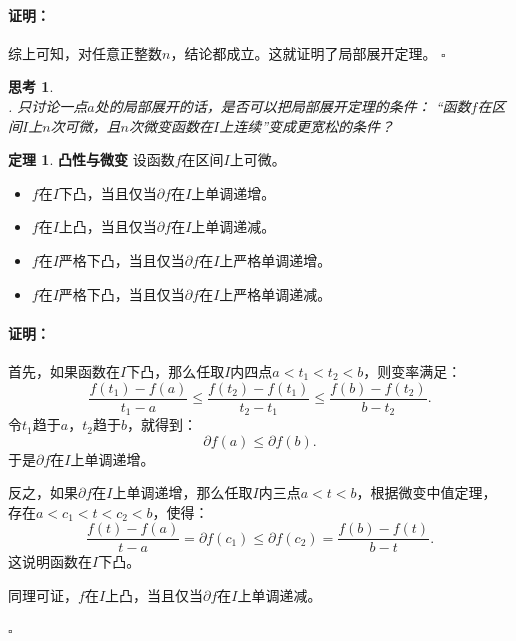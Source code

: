 \documentclass[12pt,UTF8]{ctexbook}
\theoremstyle{definition}
\newtheorem{tm}{定理}[section]
\theoremstyle{plain}
\newtheorem{sk}{思考}[section]
\renewenvironment{proof}{\paragraph{\textbf{证明：}}}{\hfill$\square$}
\begin{document}
\begin{appendix}
\begin{proof}
    综上可知，对任意正整数$n$，结论都成立。这就证明了局部展开定理。
\end{proof}

\begin{sk}
    \mbox{} \\
    . 只讨论一点$a$处的局部展开的话，是否可以把局部展开定理的条件：
    “函数$f$在区间$I$上$n$次可微，且$n$次微变函数在$I$上连续”变成更宽松的条件？\\
\end{sk}

\begin{tm}{\textbf{凸性与微变}}
    设函数$f$在区间$I$上可微。
    \begin{itemize}
        \item $f$在$I$下凸，当且仅当$\partial f$在$I$上单调递增。
        \item $f$在$I$上凸，当且仅当$\partial f$在$I$上单调递减。
        \item $f$在$I$严格下凸，当且仅当$\partial f$在$I$上严格单调递增。
        \item $f$在$I$严格下凸，当且仅当$\partial f$在$I$上严格单调递减。
    \end{itemize}
\end{tm}

\begin{proof}
    首先，如果函数在$I$下凸，那么任取$I$内四点$a < t_1 < t_2 < b$，则变率满足：
    $$ \frac{f(t_1) - f(a)}{t_1 - a} \leqslant \frac{f(t_2) - f(t_1)}{t_2 - t_1} \leqslant \frac{f(b) - f(t_2)}{b - t_2}. $$
    令$t_1$趋于$a$，$t_2$趋于$b$，就得到：
    $$ \partial f(a) \leqslant \partial f(b).$$
    于是$\partial f$在$I$上单调递增。

    反之，如果$\partial f$在$I$上单调递增，那么任取$I$内三点$a < t < b$，根据微变中值定理，
    存在$a < c_1 < t < c_2 < b$，使得：
    $$ \frac{f(t) - f(a)}{t - a} = \partial f(c_1) \leqslant  \partial f(c_2) = \frac{f(b) - f(t)}{b - t}. $$
    这说明函数在$I$下凸。

    同理可证，$f$在$I$上凸，当且仅当$\partial f$在$I$上单调递减。


\end{proof}
\end{appendix}
\end{document}
